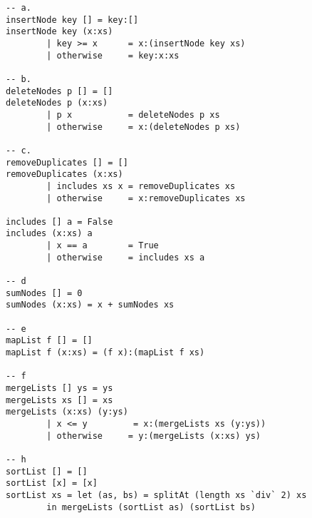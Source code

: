 \fontsize{8pt}{10pt}
\begin{verbatim}
-- a.
insertNode key [] = key:[]
insertNode key (x:xs)
        | key >= x      = x:(insertNode key xs)
        | otherwise     = key:x:xs

-- b. 
deleteNodes p [] = []
deleteNodes p (x:xs)
        | p x           = deleteNodes p xs
        | otherwise     = x:(deleteNodes p xs)
        
-- c.
removeDuplicates [] = []
removeDuplicates (x:xs)
        | includes xs x = removeDuplicates xs
        | otherwise     = x:removeDuplicates xs
        
includes [] a = False
includes (x:xs) a
        | x == a        = True
        | otherwise     = includes xs a
        
-- d
sumNodes [] = 0
sumNodes (x:xs) = x + sumNodes xs

-- e
mapList f [] = []
mapList f (x:xs) = (f x):(mapList f xs)
         
-- f
mergeLists [] ys = ys
mergeLists xs [] = xs
mergeLists (x:xs) (y:ys)
        | x <= y         = x:(mergeLists xs (y:ys))
        | otherwise     = y:(mergeLists (x:xs) ys)  

-- h
sortList [] = []
sortList [x] = [x]
sortList xs = let (as, bs) = splitAt (length xs `div` 2) xs
        in mergeLists (sortList as) (sortList bs)
\end{verbatim}
